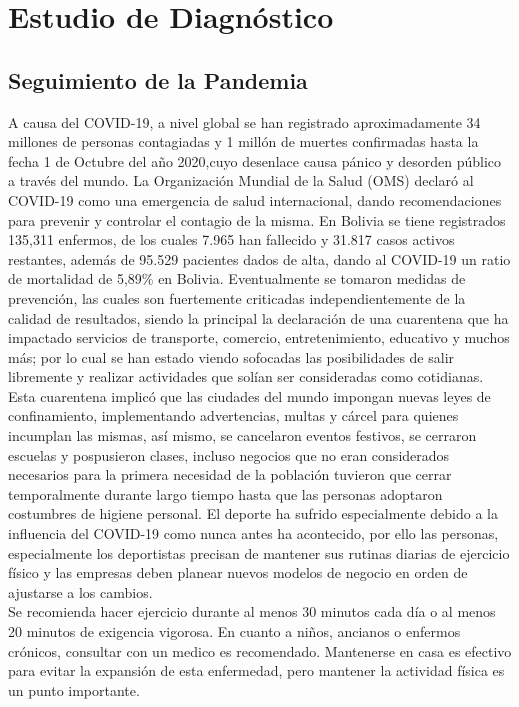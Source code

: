\chapter{Estudio de Diagnóstico}

\section{Seguimiento de la Pandemia}

A causa del COVID-19, a nivel global se han registrado aproximadamente 34 millones de personas contagiadas y 1 millón de muertes confirmadas hasta la fecha 1 de Octubre del año 2020,cuyo desenlace causa pánico y desorden público a través del mundo. La Organización Mundial de la Salud (OMS) declaró al COVID-19 como una emergencia de salud internacional, dando recomendaciones para prevenir y controlar el contagio de la misma. En Bolivia se tiene registrados 135,311 enfermos, de los cuales 7.965 han fallecido y 31.817 casos activos restantes, además de 95.529 pacientes dados de alta, dando al COVID-19 un ratio de mortalidad de 5,89\% en Bolivia. Eventualmente se tomaron medidas de prevención, las cuales son fuertemente criticadas independientemente de la calidad de resultados, siendo la principal la declaración de una cuarentena que ha impactado servicios de transporte, comercio, entretenimiento, educativo y muchos más; por lo cual se han estado viendo sofocadas las posibilidades de salir libremente y realizar actividades que solían ser consideradas como cotidianas.\\

Esta cuarentena implicó que las ciudades del mundo impongan nuevas leyes de confinamiento, implementando advertencias, multas y cárcel para quienes incumplan las mismas, así mismo, se cancelaron eventos festivos, se cerraron escuelas y pospusieron clases, incluso negocios que no eran considerados necesarios para la primera necesidad de la población tuvieron que cerrar temporalmente durante largo tiempo hasta que las personas adoptaron costumbres de higiene personal. El deporte ha sufrido especialmente debido a la influencia del COVID-19 como nunca antes ha acontecido, por ello las personas, especialmente los deportistas precisan de mantener sus rutinas diarias de ejercicio físico y las empresas deben planear nuevos modelos de negocio en orden de ajustarse a los cambios.\\

Se recomienda hacer ejercicio durante al menos 30 minutos cada día o al menos 20 minutos de exigencia vigorosa. En cuanto a niños, ancianos o enfermos crónicos, consultar con un medico es recomendado. Mantenerse en casa es efectivo para evitar la expansión de esta enfermedad, pero mantener la actividad física es un punto importante.\\


